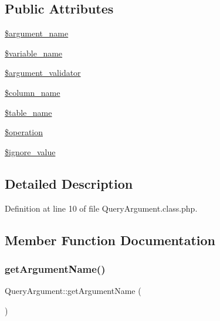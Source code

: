 \subsection*{Public Attributes}
\begin{DoxyCompactItemize}
\item 
\hyperlink{classQueryArgument_a90dcd71abf0c257d8cde2ac08de1cc4a}{\$argument\+\_\+name}
\item 
\hyperlink{classQueryArgument_a5f944bd99adb53d05a61aba70ff79d20}{\$variable\+\_\+name}
\item 
\hyperlink{classQueryArgument_a0af5784d1cea24a72fbb59b1fd1905c7}{\$argument\+\_\+validator}
\item 
\hyperlink{classQueryArgument_a6574925c4191d63ad3446ea7a9d38020}{\$column\+\_\+name}
\item 
\hyperlink{classQueryArgument_aba0fc1aa9d394626c35a4dd6b23452a1}{\$table\+\_\+name}
\item 
\hyperlink{classQueryArgument_a31f8bb196f9755a568a4fc69c4be08e3}{\$operation}
\item 
\hyperlink{classQueryArgument_a2833a265532882ef5cb5386894ef503e}{\$ignore\+\_\+value}
\end{DoxyCompactItemize}


\subsection{Detailed Description}


Definition at line 10 of file Query\+Argument.\+class.\+php.



\subsection{Member Function Documentation}
\mbox{\label{classQueryArgument_a01a5627882c4034551e0c22daed811bd}} 
\subsubsection{\texorpdfstring{get\+Argument\+Name()}{getArgumentName()}}
{\footnotesize\ttfamily Query\+Argument\+::get\+Argument\+Name (\begin{DoxyParamCaption}{ }\end{DoxyParamCaption})}



